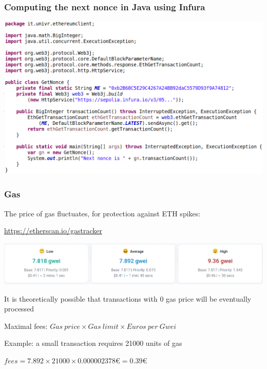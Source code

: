 \documentclass[11pt]{beamer}  %
\begin{document}
\begin{frame}\frametitle{Computing the next nonce in Java using Infura}

  \begin{center}
    \includegraphics[width=\textwidth,clip=false]{pictures/get-nonce-java.png}
  \end{center}

\end{frame}

\begin{frame}\frametitle{Gas}

  The price of gas fluctuates, for protection against ETH spikes:

  \medskip

  \begin{greenbox}{\url{https://etherscan.io/gastracker}}
    \begin{center}
      \includegraphics[width=\textwidth,clip=false]{pictures/ethgasstation.png}
    \end{center}
  \end{greenbox}

  \bigskip

  It is theoretically possible that transactions with $0$ gas price will be eventually
  processed

  \medskip

  Maximal fees: $\mathit{Gas\ price}\times\mathit{Gas\ limit}
  \times \mathit{Euros\ per\ Gwei}$

  \medskip

  \begin{redbox}{Example: a small transaction requires 21000 units of gas}
    \begin{center}
      $\mathit{fees} = 7.892\times 21000\times 0.000002378$€$=0.39$€
    \end{center}
  \end{redbox}
  
\end{frame}
\end{document}
